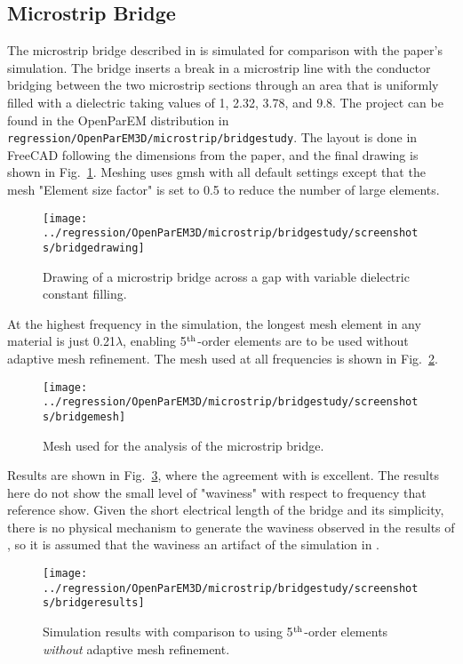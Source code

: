 \documentclass[titlepage]{article}
\renewcommand\_{\textunderscore\linebreak[1]}
\begin{document}
\subsection{Microstrip Bridge}

The microstrip bridge described in \cite{Wang} is simulated for comparison with the paper's simulation.  The bridge inserts a break in a microstrip line with the conductor bridging between the two microstrip sections through an area that is uniformly filled with a dielectric taking values of 1, 2.32, 3.78, and 9.8.  The project can be found in the OpenParEM distribution in \texttt{regression/OpenParEM3D/microstrip/bridge\_study}.  The layout is done in FreeCAD following the dimensions from the paper, and the final drawing is shown in Fig.~\ref{fig:bridge_drawing}.  Meshing uses gmsh with all default settings except that the mesh "Element size factor" is set to 0.5 to reduce the number of large elements.

\begin{figure}[H]
  \centering
  \texttt{[image: ../regression/OpenParEM3D/microstrip/bridge\_study/screenshots/bridge\_drawing]}
  \caption{Drawing of a microstrip bridge across a gap with variable dielectric constant filling.}
  \label{fig:bridge_drawing}
\end{figure}

At the highest frequency in the simulation, the longest mesh element in any material is just 0.21$\lambda$, enabling 5$^{\textnormal{th}}$-order elements are to be used without adaptive mesh refinement.  The mesh used at all frequencies is shown in Fig.~\ref{fig:bridge_mesh}.

\begin{figure}[H]
  \centering
  \texttt{[image: ../regression/OpenParEM3D/microstrip/bridge\_study/screenshots/bridge\_mesh]}
  \caption{Mesh used for the analysis of the microstrip bridge.}
  \label{fig:bridge_mesh}
\end{figure}

Results are shown in Fig.~\ref{fig:bridge_results}, where the agreement with \cite{Wang} is excellent.  The results here do not show the small level of "waviness" with respect to frequency that reference \cite{Wang} show.  Given the short electrical length of the bridge and its simplicity, there is no physical mechanism to generate the waviness observed in the results of \cite{Wang}, so it is assumed that the waviness an artifact of the simulation in \cite{Wang}.

\begin{figure}[H]
  \centering
  \texttt{[image: ../regression/OpenParEM3D/microstrip/bridge\_study/screenshots/bridge\_results]}
  \caption{Simulation results with comparison to \cite{Wang} using 5$^{\textnormal{th}}$-order elements \textit{without} adaptive mesh refinement.}
  \label{fig:bridge_results}
\end{figure}
\end{document}

